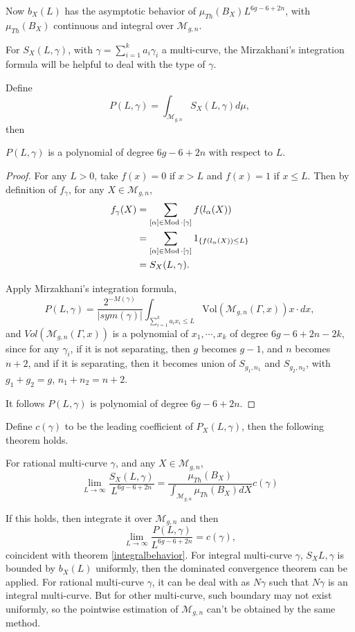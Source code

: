 Now $b_X(L)$ has the asymptotic  behavior of $\mu_{Th}(B_X)L^{6g-6+2n}$, with $\mu_{Th}(B_X)$ continuous and integral over $\mathscr{M}_{g,n}$. 

For $S_X(L,\gamma)$, with $\gamma=\sum_{i=1}^ka_i\gamma_i$ a multi-curve, the Mirzakhani's integration formula  will be helpful to deal with the type of $\gamma$.

Define $$P(L,\gamma)=\int_{\mathscr{M}_{g,n}}S_X(L,\gamma)d\mu,$$ then 

\begin{theorem}\label{integralbehavior}
$P(L,\gamma)$ is a polynomial of degree $6g-6+2n$ with respect to $L$.    
\end{theorem}


\begin{proof}
For any $L>0$, take $f(x)=0$ if $x>L$ and $f(x)=1$ if $x\leq L$. Then by definition of $f_\gamma$, for any $X\in\mathscr{M}_{g,n}$,
$$
\begin{aligned}
    f_\gamma(X)&=\sum_{[\alpha]\in \operatorname{Mod}\cdot [\gamma]}f(l_\alpha(X))\\
    &=\sum_{[\alpha]\in \operatorname{Mod}\cdot [\gamma]} 1_{\{f(l_\alpha(X))\leq L\}}\\
    &=S_X(L,\gamma).\\
\end{aligned}
$$

Apply  Mirzakhani's integration formula, $$
P(L,\gamma)=\frac{2^{-M(\gamma)}}{|sym(\gamma)|}\int_{\sum_{i=1}^ka_ix_i\leq L}\mathrm{Vol}(\mathscr{M}_{g,n}(\Gamma,x))x\cdot dx,
$$
and $Vol(\mathscr{M}_{g,n}(\Gamma,x))$ is a polynomial of $x_1,\cdots,x_k$ of degree $6g-6+2n-2k$, since for any $\gamma_i$, if it is not separating, then $g$ becomes $g-1$, and $n$ becomes $n+2$, and if it is separating,  then it becomes union of $S_{g_1,n_1}$ and $S_{g_2,n_2}$, with $g_1+g_2=g$, $n_1+n_2=n+2$.

It follows $P(L,\gamma)$ is  polynomial of degree $6g-6+2n$.
\end{proof}

Define $c(\gamma)$ to be the leading coefficient of $P_X(L,\gamma)$, then the following theorem holds.

\begin{theorem}\label{pointwisebehavior}
For rational multi-curve $\gamma$, and any $X\in \mathscr{M}_{g,n}$, 
$$
\lim_{L\to \infty}\frac{S_X(L,\gamma)}{L^{6g-6+2n}}=\frac{\mu_{Th}(B_X)}{\int_{\mathscr{M}_{g,n}}\mu_{Th}(B_X)dX}c(\gamma)
$$
\end{theorem}
\begin{remark}
If this holds, then integrate it over  $\mathscr{M}_{g,n}$ and then $$\lim_{L\to \infty}\frac{P(L,\gamma)}{L^{6g-6+2n}}=c(\gamma),$$ coincident with theorem \ref{integralbehavior}.
For integral multi-curve $\gamma$, $S_X{L,\gamma}$ is bounded by $b_X(L)$ uniformly, then the dominated convergence theorem can be applied. For rational multi-curve $\gamma$,  it can be deal  with as $N\gamma$ such that $N\gamma$ is an integral multi-curve. But for other multi-curve, such boundary  may not exist uniformly, so the pointwise estimation  of $\mathscr{M}_{g,n}$ can't be obtained by the same method.
\end{remark}

